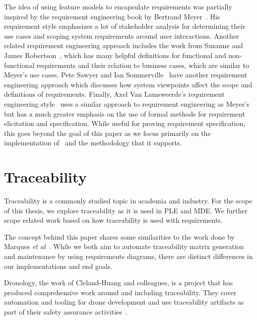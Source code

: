 The idea of using feature models to encapsulate requirements was partially inspired by the requirement engineering book by Bertrand Meyer~\cite{meyer2022handbook}. His requirement style emphasizes a lot of stakeholder analysis for determining their use cases and scoping system requirements around user interactions. Another related requirement engineering approach includes the work from Suzanne and James Robertson~\cite{robertson2012mastering, robertson2000volere}, which has many helpful definitions for functional and non-functional requirements and their relation to business cases, which are similar to Meyer's use cases. Pete Sawyer and Ian Sommerville~\cite{sommerville1997requirements, sommerville1997viewpoints} have another requirement engineering approach which discusses how system viewpoints affect the scope and definitions of requirements. Finally, Axel Van Lamsweerde's requirement engineering style~\cite{lamsweerde2009requirements} uses a similar approach to requirement engineering as Meyer's but has a much greater emphasis on the use of formal methods for requirement elicitation and specification. While useful for proving requirement specification, this goes beyond the goal of this paper as we focus primarily on the implementation of \tool\ and the methodology that it supports.


\section{Traceability}

Traceability is a commonly studied topic in academia and industry. For the scope of this thesis, we explore traceability as it is used in \ac{PLE} and \ac{MDE}. We further scope related work based on how traceability is used with requirements. 

The concept behind this paper shares some similarities to the work done by Marques \textit{\textit{et al}}~\cite{6945504}. While we both aim to automate traceability matrix generation and maintenance by using requirements diagrams, there are distinct differences in our implementations and end goals. 

Dronology, the work of Cleland-Huang and colleagues, is a project that has produced comprehensive work around and including traceability. They cover automation and tooling for drone development and use traceability artifacts as part of their safety assurance activities~\cite{Cleland-HuangBCSR07, AgrawalC23, DBLP:conf/splc/Cleland-HuangAI20, mirakhorli2011tracing}.


